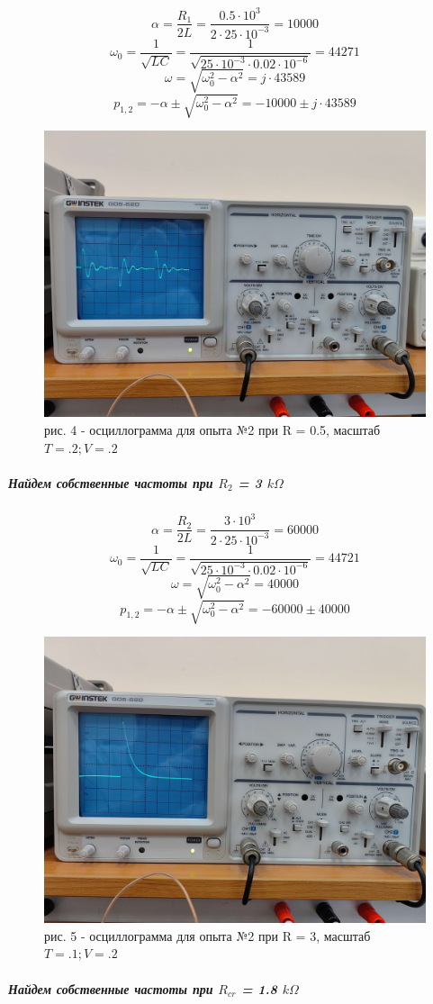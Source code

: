\documentclass[a4paper,12pt]{report}
\begin{document}
\begin{flushleft}
\[ \alpha = \frac{R_1}{2L} = \frac{0.5\cdot 10^3}{2\cdot 25\cdot 10^{-3}} = 10000 \]
\[ \omega_0 = \frac{1}{\sqrt{LC}} = \frac{1}{\sqrt{25\cdot 10^{-3}\cdot 0.02\cdot 10^{-6}}} = 44271 \]
\[ \omega = \sqrt{\omega_0^2 - \alpha^2} = j\cdot 43589 \]
\[ p_{1,2} = -\alpha \pm \sqrt{\omega_0^2 - \alpha^2} = -10000 \pm j\cdot 43589 \]
\begin{figure}[h!]
  \includegraphics[width=1\textwidth]{graph2.jpg}
  \label{ris:image4}
  рис. 4 - осциллограмма для опыта №2 при R = 0.5, масштаб $T = .2; V = .2$
\end{figure}
\newpage
\subparagraph*{Найдем собственные частоты при $R_2$ = 3 $k\Omega$}

\[ \alpha = \frac{R_2}{2L} = \frac{3\cdot 10^3}{2\cdot 25\cdot 10^{-3}} = 60000 \]
\[ \omega_0 = \frac{1}{\sqrt{LC}} = \frac{1}{\sqrt{25\cdot 10^{-3}\cdot 0.02\cdot 10^{-6}}} =  44721\]
\[ \omega = \sqrt{\omega_0^2 - \alpha^2} = 40000 \]
\[ p_{1,2} = -\alpha \pm \sqrt{\omega_0^2 - \alpha^2} = -60000 \pm  40000 \]
\begin{figure}[h!]
  \includegraphics[width=1\textwidth]{graph3.jpg}
  \label{ris:image5}
  рис. 5 - осциллограмма для опыта №2 при R = 3, масштаб $T = .1; V = .2$
\end{figure}
\newpage
\subparagraph*{Найдем собственные частоты при $R_{cr}$ = 1.8 $k\Omega$}


\end{flushleft}
\end{document}
